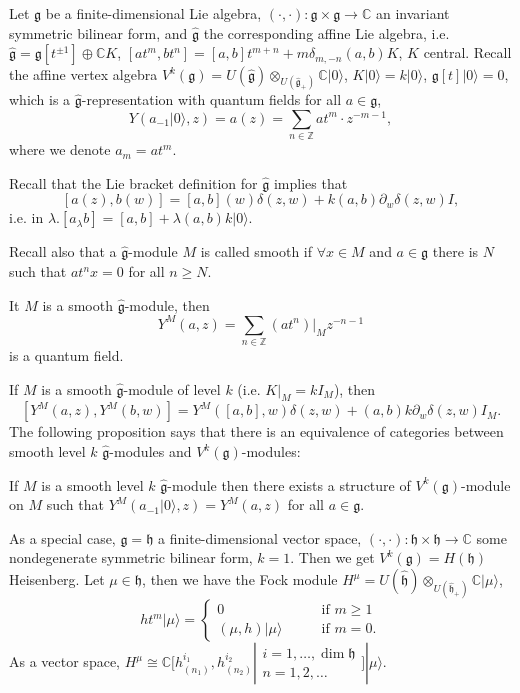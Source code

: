 \medskip\noindent
Let $\mathfrak{g}$ be a finite-dimensional Lie algebra,
$(\cdot,\cdot):\mathfrak{g} \times \mathfrak{g} \to \mathbb{C}$
an invariant symmetric bilinear form, and $\hat{\mathfrak{g}}$ the 
corresponding affine Lie algebra, i.e.
$\hat{\mathfrak{g}}=\mathfrak{g}[t^{\pm 1}] \oplus \mathbb{C}K$,
$[at^m,bt^n]=[a,b]t^{m+n}+m\delta_{m,-n}(a,b)K$, $K$ central.
Recall the affine vertex algebra 
$V^k(\mathfrak{g})=U(\hat{\mathfrak{g}}) \otimes_{U(\hat{\mathfrak{g}}_+)}
\mathbb{C}|0\rangle$,
$K |0\rangle=k |0\rangle$, $\mathfrak{g}[t]|0\rangle=0$,
which is a $\hat{\mathfrak{g}}$-representation with quantum fields
for all $a \in \mathfrak{g}$,
$$
Y(a_{-1}|0\rangle,z)=a(z)=\sum_{n \in \mathbb{Z}}at^m \cdot z^{-m-1},
$$
where we denote $a_m=at^m$.

Recall that the Lie bracket definition for $\hat{\mathfrak{g}}$ implies that
$$
[a(z),b(w)]=[a,b](w)\delta(z,w)+k(a,b)\partial_w\delta(z,w)I,
$$
i.e. in $\lambda$.$[a_\lambda b]=[a,b]+\lambda(a,b)k|0\rangle$.

Recall also that a $\hat{\mathfrak{g}}$-module $M$ is called
smooth if $\forall x \in M$ and $a \in \mathfrak{g}$ there
is $N$ such that $at^n x=0$ for all $n \geq N$.

It $M$ is a smooth $\hat{\mathfrak{g}}$-module,
then 
$$
Y^M(a,z)=\sum_{n \in \mathbb{Z}}(at^n)|_{M}z^{-n-1}
$$
is a quantum field.

If $M$ is a smooth $\hat{\mathfrak{g}}$-module of level $k$ 
(i.e. $K|_{M}=k I_M$), then
$$
[Y^M(a,z),Y^M(b,w)]
=Y^M([a,b],w)\delta(z,w)+(a,b)k\partial_w \delta(z,w)I_M.
$$
The following proposition says that there is an equivalence of
categories between smooth level $k$ $\hat{\mathfrak{g}}$-modules
and $V^k(\mathfrak{g})$-modules:

\begin{proposition}
\label{proposition-equivalence-vmods}
If $M$ is a smooth level $k$ $\hat{\mathfrak{g}}$-module
then there exists a structure of $V^k(\mathfrak{g})$-module on $M$ 
such that $Y^M(a_{-1}|0\rangle,z)=Y^M(a,z)$ for all $a \in \mathfrak{g}$.
\end{proposition}

\noindent
As a special case, $\mathfrak{g}=\mathfrak{h}$ a finite-dimensional
vector space, $(\cdot,\cdot):\mathfrak{h}\times\mathfrak{h}\to\mathbb{C}$ 
some nondegenerate symmetric bilinear form, $k=1$.
Then we get  $V^k(\mathfrak{g})=H(\mathfrak{h})$ Heisenberg.
Let $\mu \in \mathfrak{h}$, then we have the Fock module
$H^\mu = 
U(\hat{\mathfrak{h}})\otimes_{U(\hat{\mathfrak{h}}_+)}\mathbb{C}|\mu\rangle$,
$$
ht^m|\mu\rangle=\begin{cases}
0\qquad &\text{if }m\geq 1 \\
(\mu,h)|\mu\rangle\qquad &\text{if }m=0.
\end{cases}
$$
As a vector space, 
$H^\mu\cong\mathbb{C}[h^{i_1}_{(n_1)},h^{i_2}_{(n_2)}|
\substack{i=1,\ldots,\dim \mathfrak{h} \\ n=1,2,\ldots}]|\mu\rangle$.

